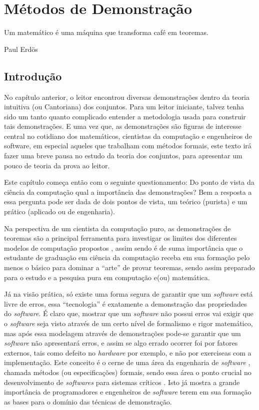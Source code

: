 \chapter{Métodos de Demonstração}\label{cap:Demonstracoes}


\epigraph{Um matemático é uma máquina que transforma café em teoremas.}{Paul Erdös}

\section{Introdução}\label{sec:Introducao-Demonstracoes}

No capítulo anterior, o leitor encontrou diversas demonstrações dentro da teoria intuitiva (ou Cantoriana) dos conjuntos. Para um leitor iniciante, talvez tenha sido um tanto quanto complicado entender a metodologia usada para construir tais demonstrações. E uma vez que, as demonstrações são figuras de interesse central no cotidiano dos matemáticos, cientistas da computação e engenheiros de software, em especial aqueles que trabalham com métodos formais, este texto irá fazer uma breve pausa no estudo da teoria dos conjuntos, para apresentar um pouco de teoria da prova ao leitor.

Este capítulo começa então com o seguinte questionamento: Do ponto de vista da ciência da computação qual a importância das demonstrações? Bem a resposta a essa pergunta pode ser dada de dois pontos de vista,  um teórico (purista) e um prático (aplicado ou de engenharia).

Na perspectiva de um cientista da computação puro, as demonstrações de teoremas são a principal ferramenta para investigar os limites dos diferentes modelos de computação propostos \cite{hopcroft2008, linz2006}, assim sendo é de suma importância que o estudante de graduação em ciência da computação receba em sua formação pelo menos o básico para dominar a ``arte'' de provar teoremas, sendo assim preparado para o estudo e a pesquisa pura em computação e(ou) matemática.

Já na visão prática, só existe uma forma segura de garantir que um \textit{software} está livre de erros, essa ``tecnologia'' é exatamente a demonstração das propriedades do \textit{software}. É claro que, mostrar que um \textit{software} não possui erros vai exigir que o \textit{software} seja visto através de um certo nível de formalismo e rigor matemático, mas após essa modelagem através de demonstrações pode-se garantir que um \textit{software} não apresentará erros, e assim se algo errado ocorrer foi por fatores externos, tais como defeito no \textit{hardware} por exemplo, e não por exerciseas com a implementação. Este conceito é o cerne de uma área da engenharia de \textit{software} \cite{pressman2016}, chamada métodos  (ou especificações) formais, sendo essa área o ponto crucial no desenvolvimento de \textit{softwares} para sistemas críticos \cite{sommerville2011}. Isto já mostra a grande importância de programadores e engenheiros de \textit{software} terem em sua formação as bases para o domínio das técnicas de demonstração.

